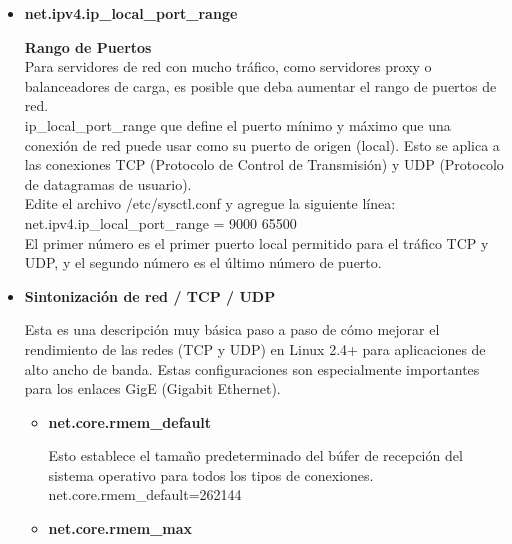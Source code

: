 \begin{itemize}
	\item \textbf{net.ipv4.ip\_local\_port\_range}

\begin{flushleft}
\textbf{Rango de Puertos}\\
Para servidores de red con mucho tráfico, como servidores proxy o balanceadores de carga, es posible que deba aumentar el rango de puertos de red.\\
\vspace{5mm}
ip\_local\_port\_range que define el puerto mínimo y máximo que una conexión de red puede usar como su puerto de origen (local). Esto se aplica a las conexiones TCP (Protocolo de Control de Transmisión) y UDP (Protocolo de datagramas de usuario).\\
\vspace{5mm}
Edite el archivo /etc/sysctl.conf y agregue la siguiente línea:\\
net.ipv4.ip\_local\_port\_range = 9000 65500\\
\vspace{5mm}
El primer número es el primer puerto local permitido para el tráfico TCP y UDP, y el segundo número es el último número de puerto.\\
\end{flushleft}

\item \textbf{Sintonización de red / TCP / UDP}

\begin{flushleft}
Esta es una descripción muy básica paso a paso de cómo mejorar el rendimiento de las redes (TCP y UDP) en Linux 2.4+ para aplicaciones de alto ancho de banda. Estas configuraciones son especialmente importantes para los enlaces GigE (Gigabit Ethernet).\\
\end{flushleft}

\begin{itemize}
	\item \textbf{net.core.rmem\_default}

\begin{flushleft}
Esto establece el tamaño predeterminado del búfer de recepción del sistema operativo para todos los tipos de conexiones.\\
\vspace{5mm}
net.core.rmem\_default=262144\\
\end{flushleft}

	\item \textbf{net.core.rmem\_max}


\end{itemize}
\end{itemize}
